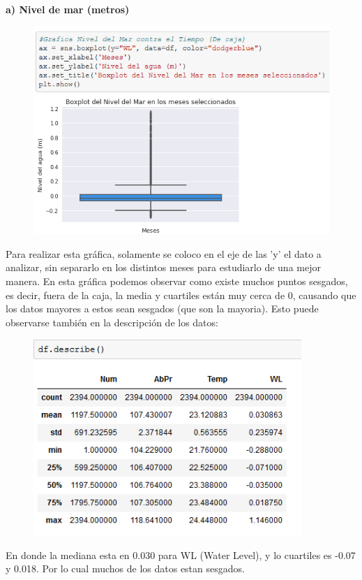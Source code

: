 \documentclass[12pt]{article}
\begin{document}
\noindent\textbf {a) Nivel de mar (metros)}

\begin{figure}[h]
    \centering
\includegraphics[width=4.5in]{Caja1.png}
\end{figure}

Para realizar esta gráfica, solamente se coloco en el eje de las 'y' el dato a analizar, sin separarlo en los distintos meses para estudiarlo de una mejor manera. En esta gráfica podemos observar como existe muchos puntos sesgados, es decir, fuera de la caja, la media y cuartiles están muy cerca de 0, causando que los datos mayores a estos sean sesgados (que son la mayoria). Esto puede observarse también en la descripción de los datos:

\begin{figure}[h]
    \centering
\includegraphics[width=4in]{dfdescribe.png}
\end{figure}
 
 En donde la mediana esta en 0.030 para WL (Water Level), y lo cuartiles es -0.07 y 0.018. Por lo cual muchos de los datos estan sesgados. \\
 
\end{document}
